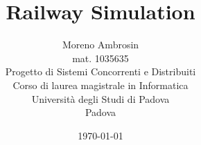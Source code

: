 \documentclass[12pt,a4paper]{report}
\title{\Huge Railway Simulation}
\author	{
	\Large Moreno Ambrosin\\
	\Large mat. 1035635\\
	[1.5cm]
	\Large Progetto di Sistemi Concorrenti e Distribuiti\\
	[3cm]
	\large Corso di laurea magistrale in Informatica \\
	\large Università degli Studi di Padova\\
	[1.5cm]
	\large Padova\\
	[1.5cm]
		}
\date{\today}
\begin{document}
	\maketitle
	\tableofcontents
	\newpage
	\listoffigures
	\pagestyle{content}
	
	
	
	
	
	
	
 
   \label{mylastpage}
\end{document}
